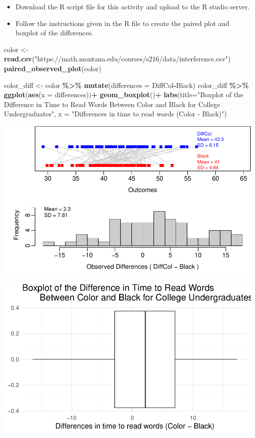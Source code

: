 \documentclass[
]{report}
\newenvironment{Shaded}{\begin{snugshade}}{\end{snugshade}}
\newcommand{\AttributeTok}[1]{\textcolor[rgb]{0.13,0.29,0.53}{#1}}
\newcommand{\FunctionTok}[1]{\textcolor[rgb]{0.13,0.29,0.53}{\textbf{#1}}}
\newcommand{\NormalTok}[1]{#1}
\newcommand{\OtherTok}[1]{\textcolor[rgb]{0.56,0.35,0.01}{#1}}
\newcommand{\SpecialCharTok}[1]{\textcolor[rgb]{0.81,0.36,0.00}{\textbf{#1}}}
\newcommand{\StringTok}[1]{\textcolor[rgb]{0.31,0.60,0.02}{#1}}
\begin{document}
\begin{itemize}
\item
  Download the R script file for this activity and upload to the R studio server.
\item
  Follow the instructions given in the R file to create the paired plot and boxplot of the differences.
\end{itemize}

\begin{Shaded}
\begin{Highlighting}[]
\NormalTok{color }\OtherTok{\textless{}{-}} \FunctionTok{read.csv}\NormalTok{(}\StringTok{"https://math.montana.edu/courses/s216/data/interference.csv"}\NormalTok{)}
\FunctionTok{paired\_observed\_plot}\NormalTok{(color)}

\NormalTok{color\_diff }\OtherTok{\textless{}{-}}\NormalTok{ color }\SpecialCharTok{\%\textgreater{}\%} 
  \FunctionTok{mutate}\NormalTok{(}\AttributeTok{differences =}\NormalTok{ DiffCol}\SpecialCharTok{{-}}\NormalTok{Black)}
\NormalTok{color\_diff }\SpecialCharTok{\%\textgreater{}\%}
  \FunctionTok{ggplot}\NormalTok{(}\FunctionTok{aes}\NormalTok{(}\AttributeTok{x =}\NormalTok{ differences))}\SpecialCharTok{+}
  \FunctionTok{geom\_boxplot}\NormalTok{()}\SpecialCharTok{+}
  \FunctionTok{labs}\NormalTok{(}\AttributeTok{title=}\StringTok{"Boxplot of the Difference in Time to Read Words }
\StringTok{       Between Color and Black for College Undergraduates"}\NormalTok{,}
       \AttributeTok{x =} \StringTok{"Differences in time to read words (Color {-} Black)"}\NormalTok{)}
\end{Highlighting}
\end{Shaded}

\begin{center}\includegraphics[width=0.7\linewidth]{11-A23-paired-theory_files/figure-latex/unnamed-chunk-1-1} \includegraphics[width=0.7\linewidth]{11-A23-paired-theory_files/figure-latex/unnamed-chunk-1-2} \end{center}
\end{document}
